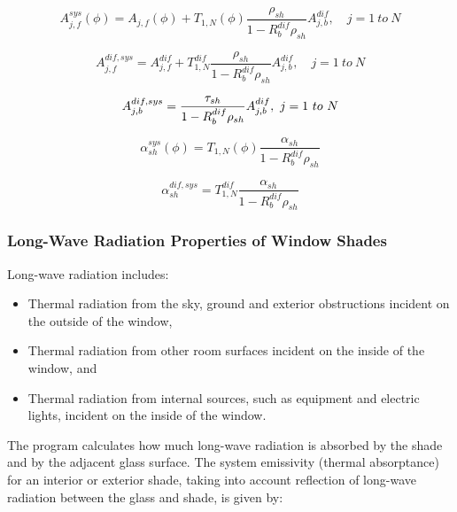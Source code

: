 \begin{equation}
A_{j,f}^{sys}(\phi ) = {A_{j,f}}(\phi ) + {T_{1,N}}(\phi )\frac{{{\rho_{sh}}}}{{1 - R_b^{dif}{\rho_{sh}}}}A_{j,b}^{dif},\quad j = 1~to~N
\end{equation}

\begin{equation}
A_{j,f}^{dif,sys} = A_{j,f}^{dif} + T_{1,N}^{dif}\frac{{{\rho_{sh}}}}{{1 - R_b^{dif}{\rho_{sh}}}}A_{j,b}^{dif},\quad j = 1~to~N
\end{equation}

\begin{equation}
A_{j,b}^{dif,sys} = \frac{{{\tau_{sh}}}}{{1 - R_b^{dif}{\rho_{sh}}}}A_{j,b}^{dif},{\rm{    }}~j = 1~to~N
\end{equation}

\begin{equation}
\alpha_{sh}^{sys}(\phi ) = T_{1,N}^{}(\phi )\frac{{{\alpha_{sh}}}}{{1 - R_b^{dif}{\rho_{sh}}}}
\end{equation}

\begin{equation}
\alpha_{sh}^{dif,sys} = T_{1,N}^{dif}\frac{{{\alpha_{sh}}}}{{1 - R_b^{dif}{\rho_{sh}}}}
\end{equation}

\subsubsection{Long-Wave Radiation Properties of Window Shades}\label{long-wave-radiation-properties-of-window-shades}

Long-wave radiation includes:

\begin{itemize}
\item Thermal radiation from the sky, ground and exterior obstructions incident on the outside of the window,
\item Thermal radiation from other room surfaces incident on the inside of the window, and
\item Thermal radiation from internal sources, such as equipment and electric lights, incident on the inside of the window.
\end{itemize}

The program calculates how much long-wave radiation is absorbed by the shade and by the adjacent glass surface. The system emissivity (thermal absorptance) for an interior or exterior shade, taking into account reflection of long-wave radiation between the glass and shade, is given by:

